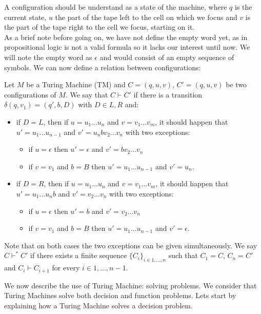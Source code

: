 A configuration should be understand as a state of the machine, where $q$ is the current state, $u$ the part of the tape left to the cell on which we focus and $v$ is the part of the tape right to the cell we focus, starting on it.\\

As a brief note before going on, we have not define the empty word yet, as in propositional logic is not a valid formula so it lacks our interest until now. We will note the empty word as $\epsilon$ and would consist of an empty sequence of symbols. We can  now define a relation between configurations:

\begin{definition}\label{def:paso}
  Let $M$ be a Turing Machine (TM) and $C=(q,u,v)$, $C'=(q,u,v)$ be two configurations of $M$. We say that $C\vdash C'$ if there is a transition $\delta (q,v_1) = (q', b, D) $ with $D\in{L,R}$ and:
  \begin{itemize}
  \item if $D=L$, then if $u=u_1...u_n$ and $v = v_1...v_m$, it should happen that $u' = u_1...u_{n-1}$ and $v' = u_n bv_2...v_n$ with two exceptions:
    \begin{itemize}
    \item if $u=\epsilon$ then $u' = \epsilon$ and $v' = bv_2...v_n$
    \item if $v = v_1$ and $b =B$ then $u'=u_1...u_{n-1}$ and $v' = u_n$.
    \end{itemize}

  \item if $D=R$, then if $u=u_1...u_n$ and $v = v_1...v_m$, it should happen that $u' = u_1...u_{n}b$ and $v' = v_2...v_n$ with two exceptions:
    \begin{itemize}
    \item if $u=\epsilon$ then $u' = b$ and $v' =v_2...v_n$
    \item if $v = v_1$ and $b =B$ then $u'=u_1...u_{n-1}$ and $v' = \epsilon$.
    \end{itemize}
  \end{itemize}

  Note that on both cases the two exceptions can be given simultaneously. We say $C\vdash^* C'$ if there exists a finite sequence $\{C_i\}_{i\in 1,...,n}$ such that $C_1 = C$, $C_n=C'$ and $C_i\vdash C_{i+1}$ for every $i\in 1,...,n-1$.  
  \end{definition}

  We now describe the use of Turing Machine: solving problems. We consider that Turing Machines solve both decision and function problems. Lets start by explaining how a Turing Machine solves a decision problem.

